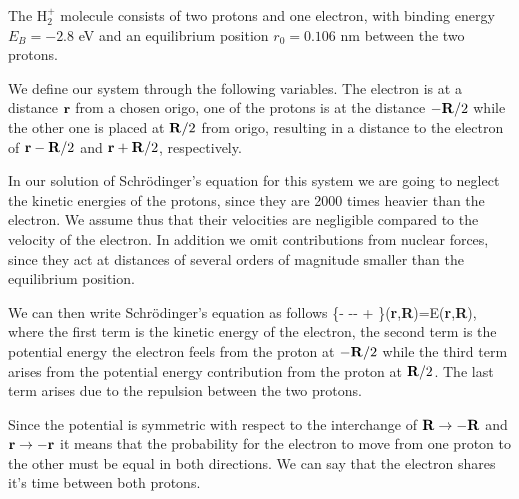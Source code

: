 \begin{prob}
The H$_2^+$ molecule  consists of  two protons and one electron,
with binding energy  $E_B=-2.8$ eV
and an equilibrium position  $r_0=0.106$ nm between the 
two protons.

We define our system through the following variables.
The electron is at a distance 
${\bf r}$ from a chosen origo, 
one of the protons is at the distance 
$-{\bf R}/2$ while the other one is placed at
${\bf R}/2$ from origo, resulting
in a distance to the electron of 
${\bf r}- {\bf R}/2$ and ${\bf r}+ {\bf R}/2$, respectively.

In our solution of Schr\"odinger's equation for this system we are going
to neglect the kinetic energies of the protons, since they are
2000 times heavier than the electron. We assume thus that their
velocities are negligible compared to the velocity of the electron.
In addition we omit contributions from  nuclear forces, since they act
at distances of several orders of magnitude smaller than the 
equilibrium position. 
 
We can then write Schr\"odinger's equation as follows
\be
    \left\{-
     --
     +
     \right\}\psi({\bf r},{\bf R})=E\psi({\bf r},{\bf R}),
\ee
where the first term is the kinetic energy of the electron,
the second term is the potential energy the electron feels
from the proton at 
$-{\bf R}/2$  while the third term arises from the potential
energy contribution from the proton at 
${\bf R}/2$. 
The last term arises due to the repulsion between the two protons.


Since the potential is symmetric with respect to the interchange 
of 
${\bf R}\rightarrow -{\bf R}$
and  ${\bf r}\rightarrow -{\bf r}$
it means that the probability for the electron to move from one 
proton to the other must be equal in both directions.
We can say that the electron shares it's time between both
protons.


\end{prob}
